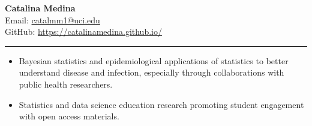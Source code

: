 \documentclass{article}
\makeatletter
\newcommand{\myname}{Catalina Medina}
\newcommand{\myemail}{\href{mailto:catalmm1@uci.edu}{catalmm1@uci.edu}}
\makeatother
\begin{document}
	\thispagestyle{empty}
	\phantom{.}\vspace{-2cm}
	\begin{center}
		{\huge \bf \myname}\\
		Email: \myemail\\
		GitHub: \href{https://catalinamedina.github.io/}{https://catalinamedina.github.io/}
	\end{center}
	
	\vspace{-4mm}
	\rule{\linewidth}{1pt}
	
	
	\begin{description}
		\vspace{-2mm}
		\item[Research Interests]\hspace*{.1in}
		
		\begin{itemize}
			\item Bayesian statistics and epidemiological applications of statistics to better understand disease and infection, especially through collaborations with public health researchers.
			\item Statistics and data science education research promoting student engagement with open access materials. 
		\end{itemize}
	\end{description}
	
\end{document}
